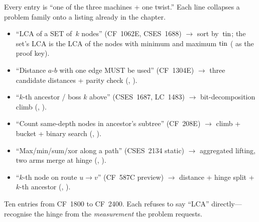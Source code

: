 
Every entry is ``one of the three machines + one twist.'' Each line
collapses a problem family onto a listing already in the chapter.

\begin{itemize}[nosep, leftmargin=1.4em]
  \item ``LCA of a SET of~\(k\) nodes'' (CF~1062E, CSES~1688)
        \(\to\) sort by~\(\operatorname{tin}\); the set's LCA is the LCA of the nodes
        with minimum and maximum \(\operatorname{tin}\)
        ( as the proof key).
  \item ``Distance \(a\)-\(b\) with one edge MUST be used'' (CF~1304E)
        \(\to\) three candidate distances + parity check
        (, ).
  \item ``\(k\)-th ancestor / boss \(k\) above'' (CSES~1687, LC~1483)
        \(\to\) bit-decomposition climb
        (, ).
  \item ``Count same-depth nodes in ancestor's subtree'' (CF~208E)
        \(\to\) climb + bucket + binary search
        (, ).
  \item ``Max/min/sum/xor along a path'' (CSES~2134 static)
        \(\to\) aggregated lifting, two arms merge at hinge
        (, ).
  \item ``\(k\)-th node on route \(u \to v\)'' (CF~587C preview)
        \(\to\) distance + hinge split + \(k\)-th ancestor
        (, ).
\end{itemize}


Ten entries from CF~1800 to CF~2400. Each refuses to say ``LCA''
directly---recognise the hinge from the \emph{measurement} the problem
requests.

